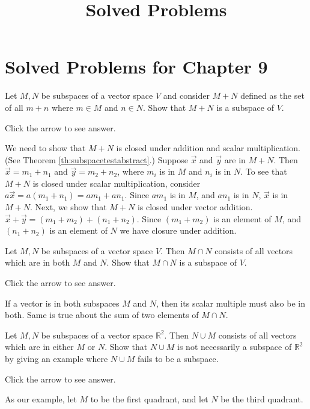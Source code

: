 \documentclass{ximera}
\title{Solved Problems} \license{CC BY-NC-SA 4.0}
\begin{document}
\begin{abstract}
\end{abstract}
\maketitle

\section*{Solved Problems for Chapter 9}

\begin{problem}\label{prb:10.17} Let $M,N$ be subspaces of a vector space $V$ and consider $M+N$
defined as the set of all $m+n$ where $m\in M$ and $n\in N$. Show that $M+N$
is a subspace of $V$.

Click the arrow to see answer.
\begin{expandable}
    We need to show that $M+N$ is closed under addition and scalar multiplication. 
 (See Theorem \ref{th:subspacetestabstract}.)  Suppose $\vec{x}$ and $\vec{y}$ are in $M+N$.  Then $\vec{x}=m_1+n_1$ and $\vec{y}=m_2+n_2$, where $m_i$ is in $M$ and $n_i$ is in $N$.  To see that $M+N$ is closed under scalar multiplication, consider $a\vec{x}=a(m_1+n_1)=am_1+an_1$.  Since $am_1$ is in $M$, and $an_1$ is in $N$, $\vec{x}$ is in $M+N$.  Next, we show that $M+N$ is closed under vector addition. $\vec{x}+\vec{y}=(m_1+m_2)+(n_1+n_2)$.  Since $(m_1+m_2)$ is an element of $M$, and $(n_1+n_2)$ is an element of $N$ we have closure under addition.
\end{expandable}
\end{problem}

\begin{problem}\label{prb:10.18} Let $M,N$ be subspaces of a vector space $V$. Then $M\cap N$ consists
of all vectors which are in both $M$ and $N$. Show that $M\cap N$ is a
subspace of $V$.

Click the arrow to see answer.
\begin{expandable}
    If a vector is in both subspaces $M$ and $N$, then its scalar multiple must also be in both.  Same is true about the sum of two elements of $M\cap N$.
\end{expandable}
\end{problem}

\begin{problem}\label{prb:10.19} Let $M,N$ be subspaces of a vector space $\mathbb{R}^{2}.$ Then $N\cup
M$ consists of all vectors which are in either $M$ or $N$. Show that $N\cup
M $ is not necessarily a subspace of $\mathbb{R}^{2}$ by giving an example
where $N\cup M$ fails to be a subspace.

Click the arrow to see answer.
\begin{expandable}
    As our example, let $M$ to be the first quadrant, and let $N$ be the third quadrant.
\end{expandable}
\end{problem}
\end{document}

